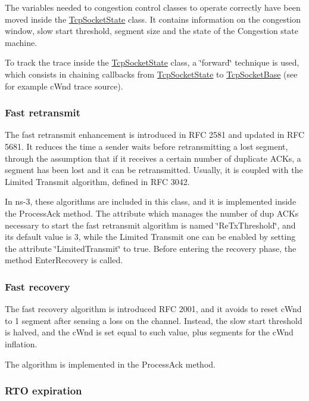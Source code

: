 The variables needed to congestion control classes to operate correctly have been moved inside the \hyperlink{classns3_1_1TcpSocketState}{Tcp\+Socket\+State} class. It contains information on the congestion window, slow start threshold, segment size and the state of the Congestion state machine.

To track the trace inside the \hyperlink{classns3_1_1TcpSocketState}{Tcp\+Socket\+State} class, a \char`\"{}forward\char`\"{} technique is used, which consists in chaining callbacks from \hyperlink{classns3_1_1TcpSocketState}{Tcp\+Socket\+State} to \hyperlink{classns3_1_1TcpSocketBase}{Tcp\+Socket\+Base} (see for example c\+Wnd trace source).

\subsubsection*{Fast retransmit }

The fast retransmit enhancement is introduced in R\+FC 2581 and updated in R\+FC 5681. It reduces the time a sender waits before retransmitting a lost segment, through the assumption that if it receives a certain number of duplicate A\+C\+Ks, a segment has been lost and it can be retransmitted. Usually, it is coupled with the Limited Transmit algorithm, defined in R\+FC 3042.

In ns-\/3, these algorithms are included in this class, and it is implemented inside the Process\+Ack method. The attribute which manages the number of dup A\+C\+Ks necessary to start the fast retransmit algorithm is named \char`\"{}\+Re\+Tx\+Threshold\char`\"{}, and its default value is 3, while the Limited Transmit one can be enabled by setting the attribute \char`\"{}\+Limited\+Transmit\char`\"{} to true. Before entering the recovery phase, the method Enter\+Recovery is called.

\subsubsection*{Fast recovery }

The fast recovery algorithm is introduced R\+FC 2001, and it avoids to reset c\+Wnd to 1 segment after sensing a loss on the channel. Instead, the slow start threshold is halved, and the c\+Wnd is set equal to such value, plus segments for the c\+Wnd inflation.

The algorithm is implemented in the Process\+Ack method.

\subsubsection*{R\+TO expiration }

